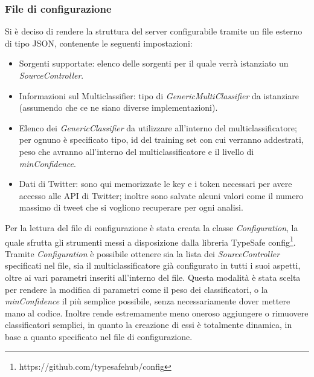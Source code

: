 \subsubsection{File di configurazione}
Si è deciso di rendere la struttura del server configurabile tramite un file esterno di tipo JSON, contenente le seguenti impostazioni:
\begin{itemize}
    \item Sorgenti supportate: elenco delle sorgenti per il quale verrà istanziato un \textit{SourceController}.
    \item Informazioni sul Multiclassifier: tipo di \textit{GenericMultiClassifier} da istanziare (assumendo che ce ne siano diverse implementazioni). 
    \item Elenco dei \textit{GenericClassifier} da utilizzare all'interno del multiclassificatore; per ognuno è specificato tipo, id del training set con cui verranno addestrati, peso che avranno all'interno del multiclassificatore e il livello di \textit{minConfidence}. 
    \item Dati di Twitter: sono qui memorizzate le key e i token necessari per avere accesso alle API di Twitter; inoltre sono salvate alcuni valori come il numero massimo di tweet che si vogliono recuperare per ogni analisi.
\end{itemize}

Per la lettura del file di configurazione è stata creata la classe \textit{Configuration}, la quale sfrutta gli strumenti messi a disposizione dalla libreria TypeSafe config\footnote{https://github.com/typesafehub/config}. Tramite \textit{Configuration} è possibile ottenere sia la lista dei \textit{SourceController} specificati nel file, sia il multiclassificatore già configurato in tutti i suoi aspetti, oltre ai vari parametri inseriti all'interno del file. \newline
Questa modalità è stata scelta per rendere la modifica di parametri come il peso dei classificatori, o la \textit{minConfidence} il più semplice possibile, senza necessariamente dover mettere mano al codice. Inoltre rende estremamente meno oneroso aggiungere o rimuovere classificatori semplici, in quanto la creazione di essi è totalmente dinamica, in base a quanto specificato nel file di configurazione. 